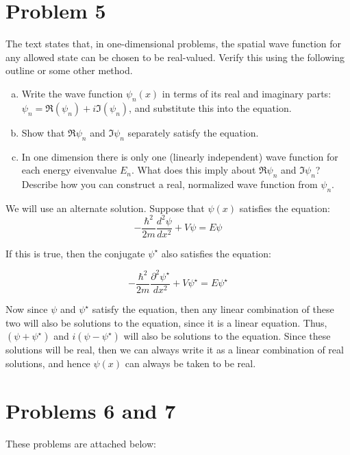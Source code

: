 \documentclass[10pt]{article}
\begin{document}
    \pagebreak

    \section*{Problem 5}

    The text states that, in one-dimensional problems, the spatial wave function for any allowed state can be chosen to be real-valued. Verify this using the following outline or some other method. 

    \begin{enumerate}[(a)]
        \item Write the wave function $\psi_n(x)$ in terms of its real and imaginary parts: $\psi_n = \Re(\psi_n) + i \Im(\psi_n)$, and substitute this into the \schrodinger equation.
        \item Show that $\Re \psi_n$ and $\Im \psi_n$ separately satisfy the \schrodinger equation.
        \item In one dimension there is only one (linearly independent) wave function for each energy eivenvalue $E_n$. What does this imply about $\Re \psi_n$ and $\Im \psi_n$? Describe how you can construct a real, normalized wave function from $\psi_n$.
    \end{enumerate}

    \begin{solution}
        We will use an alternate solution. Suppose that $\psi(x)$ satisfies the \schrodinger equation:
        \[ -\frac{\hbar^2}{2m}\frac{d^2\psi}{dx^2} + V\psi = E\psi\]

        If this is true, then the conjugate $\psi^\star$ also satisfies the \schrodinger equation:

        \[-\frac{\hbar^2}{2m}\frac{\partial^2\psi^{\star}}{dx^2} + V\psi^\star = E\psi^{\star}\]

        Now since $\psi$ and $\psi^\star$ satisfy the \schrodinger equation, then any linear combination of these two will also be solutions to the \schrodinger equation, since it is a linear equation. Thus, $(\psi + \psi^{\star})$ and $i(\psi - \psi^{\star})$ will also be solutions to the \schrodinger equation. Since these solutions will be real, then we can always write it as a linear combination of real solutions, and hence $\psi(x)$ can always be taken to be real.
    \end{solution}
    \pagebreak
    
    \section*{Problems 6 and 7}

    These problems are attached below: 
\end{document}

